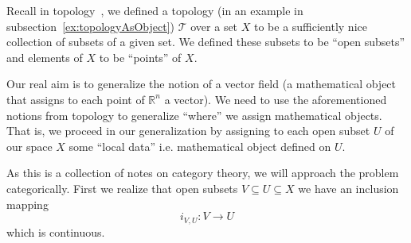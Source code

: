 
Recall in topology~\cite{alexTopology}, we defined a topology (in
an example in subsection~\ref{ex:topologyAsObject}) $\mathcal{T}$
over a set $X$ to be a sufficiently nice collection of subsets of
a given set. We defined these subsets to be ``open subsets'' and
elements of $X$ to be ``points'' of $X$.

Our real aim is to generalize the notion of a vector field (a
mathematical object that assigns to each point of
$\mathbb{R}^{n}$ a vector). We need to use the aforementioned
notions from topology to generalize ``where'' we assign
mathematical objects. That is, we proceed in our generalization
by assigning to each open subset $U$ of our space $X$ some
``local data'' i.e. mathematical object defined on $U$.

\begin{comment}
As this is a collection of notes on category theory, we will
approach the problem categorically. First we realize that each open
set $U\subseteq X$ has an inclusion mapping $i_{U}:U\to X$. This
is continuous, so it is a morphism in the category of topological
spaces. We can actually turn the topology into a category
$\ms{C}$ by making the objects open subsets of $X$ and the
morphisms inclusion mappings.

Now, what would assign a mathematical object to an open subset?
Well, we conveniently used insight that an open subset is an
object in a category $\ms{X}$ which is our topological space as a
category. Why not claim that a functor $F:\ms{X}\to\ms{C}$
assigns to each open subset $U\in\ms{X}$ some information $F(U)$?
We have to be careful about consistency problems. We have an
inclusion mapping being
\begin{equation}%
i_{A}: A\to B
\end{equation}
where $A\subseteq B$. Conversely, we also have a restriction
mapping
\begin{equation}%
\rho_{A}:B\to A
\end{equation}
which may be more useful.
\end{comment}



As this is a collection of notes on category theory, we will
approach the problem categorically. First we realize that open
subsets $V\subseteq U\subseteq X$ we have an inclusion mapping
\begin{equation}%
i_{V,U}:V\to U
\end{equation}
which is continuous.

